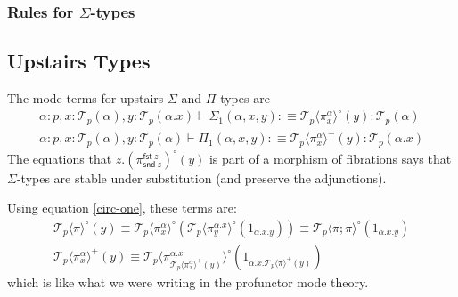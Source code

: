 \documentclass[10pt]{article}
\theoremstyle{definition}
\newcommand\dsd[1]{\ensuremath{\mathsf{#1}}}
\newcommand{\yields}{\vdash}
\newcommand\TrPlus[2]{\ensuremath{{#1}^+(#2)}}
\newcommand\TrCirc[2]{\ensuremath{{#1}^\circ(#2)}}
\newcommand\El[2]{\mathcal{T}_{#1}(#2)}
\newcommand\ApEl[2]{\mathcal{T}_{#1}\langle#2\rangle}
\newcommand{\app}[2]{\ensuremath{#1 \: #2}}
\newcommand{\fst}[1]{\app{\dsd{fst}}{#1}}
\newcommand{\snd}[1]{\app{\dsd{snd}}{#1}}
\begin{document}
\subsubsection{Rules for $\Sigma$-types}

\subsection{Upstairs Types}

The mode terms for upstairs $\Sigma$ and $\Pi$ types are
\begin{align*}
\alpha : p, x : \El{p}{\alpha}, y : \El{p}{\alpha.x} \yields \Sigma_1(\alpha,x,y) :\equiv \TrCirc{\ApEl{p}{\pi^\alpha_x}}{y}  : \El{p}{\alpha}\\
\alpha : p, x : \El{p}{\alpha}, y : \El{p}{\alpha} \yields \Pi_1(\alpha,x,y) :\equiv \TrPlus{\ApEl{p}{\pi^\alpha_x}}{y} : \El{p}{\alpha.x}
\end{align*}
The equations that $z.\TrCirc{(\pi^{\fst z}_{\snd{z}})}{y}$ is part of a
morphism of fibrations says that $\Sigma$-types are stable under
substitution (and preserve the adjunctions).

Using equation \eqref{circ-one}, these terms are:
\begin{align*}
\ApEl{p}{\pi}^\circ(y) \equiv \ApEl{p}{\pi^\alpha_x}^\circ(\ApEl{p}{\pi^{\alpha.x}_y}^\circ(1_{\alpha.x.y})) \equiv \ApEl{p}{\pi;\pi}^\circ(1_{\alpha.x.y}) \\
\ApEl{p}{\pi^\alpha_x}^+(y) \equiv \ApEl{p}{\pi^{\alpha.x}_{\ApEl{p}{\pi^\alpha_x}^+(y)}}^\circ(1_{\alpha.x.\ApEl{p}{\pi}^+(y)})
\end{align*}
which is like what we were writing in the profunctor mode theory.  
\end{document}
